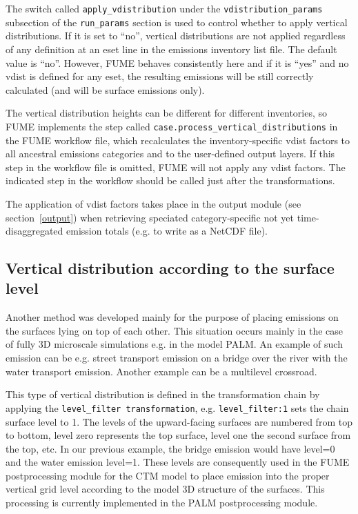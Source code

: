\documentclass[a4paper,11pt]{article}
\begin{document}
The switch called \verb|apply_vdistribution| under the  \verb|vdistribution_params| subsection of the \verb|run_params| section is used to control whether to apply vertical distributions. If it is set to ``no'', vertical distributions are not applied regardless of any definition at an eset line in the emissions inventory list file. The default value is ``no''. However, FUME behaves consistently here and if it is ``yes'' and no vdist is defined for any eset, the resulting emissions will be still correctly calculated (and will be surface emissions only).

The vertical distribution heights can be different for different inventories, so FUME implements the step called \verb|case.process_vertical_distributions| in the FUME workflow file, which recalculates the inventory-specific vdist factors to all ancestral emissions categories and to the user-defined output layers. If this step in the workflow file is omitted, FUME will not apply any vdist factors. The indicated step in the workflow should be called just after the transformations.

The application of vdist factors takes place in the output module (see section~\ref{output}) when retrieving speciated category-specific not yet time-disaggregated emission totals (e.g. to write as a NetCDF file). 

\subsection{Vertical distribution according to the surface level}
Another method was developed mainly for the purpose of placing emissions on the surfaces lying on top of each other. This situation occurs mainly in the case of fully 3D microscale simulations e.g. in the model PALM. An example of such emission can be e.g. street transport emission on a bridge over the river with the water transport emission. Another example can be a multilevel crossroad.

This type of vertical distribution is defined in the transformation chain by applying the \verb|level_filter transformation|, e.g. \verb|level_filter:1| sets the chain surface level to 1. The levels of the upward-facing surfaces are numbered from top to bottom, level zero represents the top surface, level one the second surface from the top, etc. In our previous example, the bridge emission would have level=0 and the water emission level=1. These levels are consequently used in the FUME postprocessing module for the CTM model to place emission into the proper vertical grid level according to the model 3D structure of the surfaces. This processing is currently implemented in the PALM postprocessing module.
\end{document}
